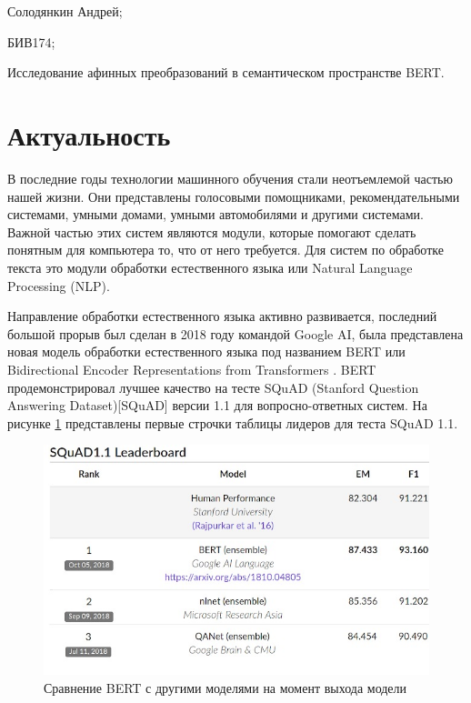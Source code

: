 \documentclass[a4paper,14pt]{article}
\begin{document}
	
	\section{}
	Солодянкин Андрей;
	
	БИВ174;
	
	Исследование афинных преобразований в семантическом пространстве BERT.
	
	\section{Актуальность}
	
	
	В последние годы технологии машинного обучения стали неотъемлемой частью нашей жизни.
	Они представлены голосовыми помощниками, рекомендательными системами, умными домами, умными автомобилями и другими системами.
	Важной частью этих систем являются модули, которые помогают сделать понятным для компьютера то, что от него требуется.
	Для систем по обработке текста это модули обработки естественного языка или Natural Language Processing (NLP).
	
	Направление обработки естественного языка активно развивается, последний большой прорыв был сделан в 2018 году командой Google AI, была представлена новая модель обработки естественного языка под названием BERT или Bidirectional Encoder Representations from Transformers \cite{bert}. 
	BERT продемонстрировал лучшее качество на тесте SQuAD (Stanford Question Answering Dataset)[SQuAD] версии 1.1 для вопросно-ответных систем. На рисунке \ref{fig:quality_bert} представлены первые строчки таблицы лидеров для теста SQuAD 1.1.
	
	\begin{figure}[H]
		\centering
		\includegraphics[width=0.6\linewidth]{images/2018-11-03.-bert-nlp-method_2}
		\caption{Сравнение BERT с другими моделями на момент выхода модели}
		\label{fig:quality_bert}
	\end{figure}
	
\end{document}
